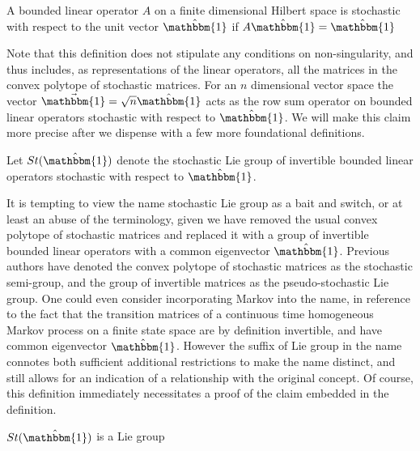 \begin{definition}
	A bounded linear operator $A$ on a finite dimensional Hilbert space is 
	stochastic with respect to the unit vector $\hat{\mathbbm{1}}$ if $A \hat{\mathbbm{1}} = \hat{\mathbbm{1}}$
\end{definition}

Note that this definition does not stipulate any conditions on non-singularity,
and thus includes, as representations of the linear operators, all the matrices 
in the convex polytope of stochastic matrices. For an $n$ dimensional vector 
space the vector $\vec{\mathbbm{1}} = \sqrt{n} \hat{\mathbbm{1}}$ acts as the 
row sum operator on bounded linear operators stochastic with respect to $\hat{\mathbbm{1}}$. 
We will make this claim more precise after we dispense with a few more 
foundational definitions.

\begin{definition}
	Let $St(\hat{\mathbbm{1}})$ denote the stochastic Lie group of invertible 
	bounded linear operators stochastic with respect to $\hat{\mathbbm{1}}$.
\end{definition}

It is tempting to view the name stochastic Lie group as a bait and switch, or 
at least an abuse of the terminology, given we have removed the usual convex
polytope of stochastic matrices and replaced it with a group of invertible 
bounded linear operators with a common eigenvector $\hat{\mathbbm{1}}$. Previous 
authors have denoted the convex polytope of stochastic matrices as the 
stochastic semi-group, and the group of invertible matrices as the 
pseudo-stochastic Lie group. One could even consider incorporating Markov into 
the name, in reference to the fact that the transition matrices of a continuous 
time homogeneous Markov process on a finite state space are by definition 
invertible, and have common eigenvector $\hat{\mathbbm{1}}$. However the suffix 
of Lie group in the name connotes both sufficient additional restrictions to 
make the name distinct, and still allows for an indication of a relationship 
with the original concept. Of course, this definition immediately necessitates a
proof of the claim embedded in the definition.

\begin{lemma}
	$St(\hat{\mathbbm{1}})$ is a Lie group
\end{lemma}

